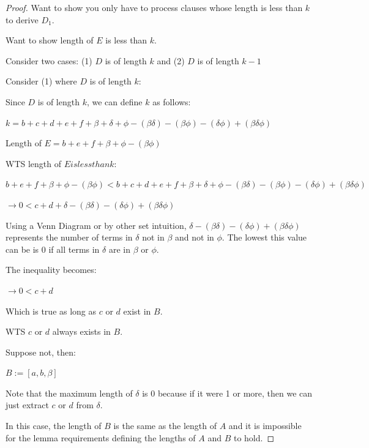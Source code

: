 \documentclass[manuscript]{acmart}
\begin{document}
\begin{proof}

        Want to show you only have to process clauses whose length is
        less than $k$ to derive $D_1$.

        Want to show length of $E$ is less than $k$.

        Consider two cases: (1) $D$ is of length $k$ and 
        (2) $D$ is of length $k - 1$
        
        Consider (1) where $D$ is of length $k$:

        Since $D$ is of length $k$, we can define $k$ as follows:

        $k = b + c + d + e + f + \beta + \delta + \phi - (\beta \delta) 
        - (\beta \phi) - (\delta \phi) + (\beta \delta \phi)$

        Length of $E = b + e + f + \beta + \phi - (\beta \phi)$
        
        WTS length of $E is less than k$:

        $b + e + f + \beta + \phi - (\beta \phi) < b + c + d + e + f + 
        \beta + \delta + \phi - (\beta \delta) - (\beta \phi) - (\delta \phi) 
        + (\beta \delta \phi)$

        $\rightarrow 0 < c + d + \delta - (\beta \delta) 
        - (\delta \phi) + (\beta \delta \phi)$

        Using a Venn Diagram or by other set intuition, $\delta - 
        (\beta \delta) - (\delta \phi) + (\beta \delta \phi)$ represents
        the number of terms in $\delta$ not in $\beta$ and not in $\phi$. 
        The lowest this value can be is 0 if all terms in $\delta$ are in 
        $\beta$ or $\phi$.

        The inequality becomes:

        $\rightarrow 0 < c + d$

        Which is true as long as $c$ or $d$ exist in $B$.

        WTS $c$ or $d$ always exists in $B$.

        Suppose not, then:

        $B := [a, b, \beta]$

        Note that the maximum length of $\delta$ is 0 because if it were 1
        or more, then we can just extract $c$ or $d$ from $\delta$.

        In this case, the length of $B$ is the same as the length of $A$ and 
        it is impossible for the lemma requirements defining the lengths
        of $A$ and $B$ to hold.


\end{proof}
\end{document}

